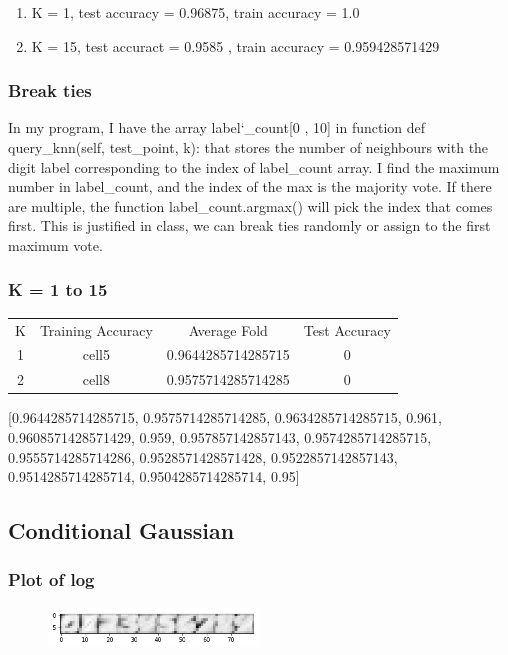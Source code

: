 \documentclass[letterpaper]{article}
\begin{document}
\begin{enumerate}[label=(\alph*)]
\item K = 1, test accuracy = 0.96875, train accuracy = 1.0
\item K = 15, test accuract = 0.9585 , train accuracy  = 0.959428571429 
\end{enumerate}

\subsubsection{Break ties}
In my program, I have the array label\char`_count[0 , 10] in function def query\_knn(self, test\_point, k): that stores the number of neighbours with the digit label corresponding to the index of label\_count array. I find the maximum number in label\_count, and the index of the max is the majority vote. If there are multiple, the function label\_count.argmax() will pick the index that comes first. This is justified in class, we can break ties randomly or assign to the first maximum vote.

\subsubsection{K = 1 to 15}

\begin{center}
\begin{tabular}{ |c|c|c|c| } 
 \hline
 K & Training Accuracy & Average Fold & Test Accuracy \\ 
 1 & cell5  & 0.9644285714285715   & 0  \\ 
 2 & cell8   &  0.9575714285714285 & 0\\
 
 \hline
\end{tabular}
\end{center}


[0.9644285714285715, 0.9575714285714285, 0.9634285714285715, 0.961, 0.9608571428571429, 0.959, 0.957857142857143, 0.9574285714285715, 0.9555714285714286, 0.9528571428571428, 0.9522857142857143, 0.9514285714285714, 0.9504285714285714, 0.95]

\subsection{Conditional Gaussian}
\subsubsection{Plot of log}
\begin{figure}[H]
\centering
\includegraphics[width=0.5\textwidth]{log_sigma_k.png}
\caption{\label{}}
\end{figure}
\end{document}
